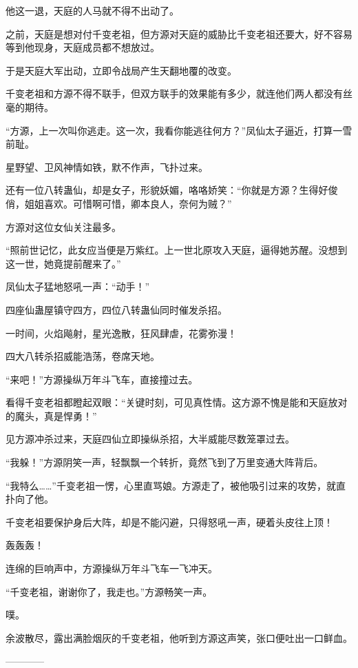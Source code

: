 \begin{this_body}
他这一退，天庭的人马就不得不出动了。

之前，天庭是想对付千变老祖，但方源对天庭的威胁比千变老祖还要大，好不容易等到他现身，天庭成员都不想放过。

于是天庭大军出动，立即令战局产生天翻地覆的改变。

千变老祖和方源不得不联手，但双方联手的效果能有多少，就连他们两人都没有丝毫的期待。

“方源，上一次叫你逃走。这一次，我看你能逃往何方？”凤仙太子逼近，打算一雪前耻。

星野望、卫风神情如铁，默不作声，飞扑过来。

还有一位八转蛊仙，却是女子，形貌妖媚，咯咯娇笑：“你就是方源？生得好俊俏，姐姐喜欢。可惜啊可惜，卿本良人，奈何为贼？”

方源对这位女仙关注最多。

“照前世记忆，此女应当便是万紫红。上一世北原攻入天庭，逼得她苏醒。没想到这一世，她竟提前醒来了。”

凤仙太子猛地怒吼一声：“动手！”

四座仙蛊屋镇守四方，四位八转蛊仙同时催发杀招。

一时间，火焰飚射，星光逸散，狂风肆虐，花雾弥漫！

四大八转杀招威能浩荡，卷席天地。

“来吧！”方源操纵万年斗飞车，直接撞过去。

看得千变老祖都瞪起双眼：“关键时刻，可见真性情。这方源不愧是能和天庭放对的魔头，真是悍勇！”

见方源冲杀过来，天庭四仙立即操纵杀招，大半威能尽数笼罩过去。

“我躲！”方源阴笑一声，轻飘飘一个转折，竟然飞到了万里变通大阵背后。

“我特么……”千变老祖一愣，心里直骂娘。方源走了，被他吸引过来的攻势，就直扑向了他。

千变老祖要保护身后大阵，却是不能闪避，只得怒吼一声，硬着头皮往上顶！

轰轰轰！

连绵的巨响声中，方源操纵万年斗飞车一飞冲天。

“千变老祖，谢谢你了，我走也。”方源畅笑一声。

噗。

余波散尽，露出满脸烟灰的千变老祖，他听到方源这声笑，张口便吐出一口鲜血。

------------

\end{this_body}

